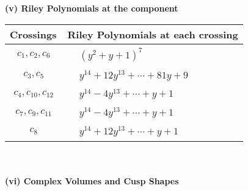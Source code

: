\documentclass[1p]{elsarticle_modified}
\theoremstyle{definition}
\begin{document}
\newpage\renewcommand{\arraystretch}{1}
\flushleft \textbf{(v) Riley Polynomials at the component}\newline \\
\begin{tabular}{m{50pt}|m{274pt}}
Crossings & \hspace{64pt}Riley Polynomials at each crossing \\
\hline $$\begin{aligned}c_{1},c_{2},c_{6}\end{aligned}$$&$\begin{aligned}
&(y^2+y+1)^7
\end{aligned}$\\
\hline $$\begin{aligned}c_{3},c_{5}\end{aligned}$$&$\begin{aligned}
&y^{14}+12 y^{13}+\cdots+81 y+9
\end{aligned}$\\
\hline $$\begin{aligned}c_{4},c_{10},c_{12}\end{aligned}$$&$\begin{aligned}
&y^{14}-4 y^{13}+\cdots+y+1
\end{aligned}$\\
\hline $$\begin{aligned}c_{7},c_{9},c_{11}\end{aligned}$$&$\begin{aligned}
&y^{14}-4 y^{13}+\cdots+y+1
\end{aligned}$\\
\hline $$\begin{aligned}c_{8}\end{aligned}$$&$\begin{aligned}
&y^{14}+12 y^{13}+\cdots+y+1
\end{aligned}$\\
\hline
\end{tabular}\\~\\
\newpage\flushleft \textbf{(vi) Complex Volumes and Cusp Shapes}
\end{document}

